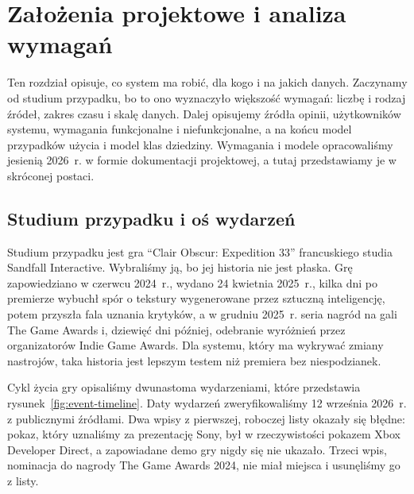 \chapter{Założenia projektowe i analiza wymagań}
\label{chap:requirements}


Ten rozdział opisuje, co system ma robić, dla kogo i na jakich danych.
Zaczynamy od studium przypadku, bo to ono wyznaczyło większość wymagań: liczbę i rodzaj źródeł, zakres czasu i skalę danych.
Dalej opisujemy źródła opinii, użytkowników systemu, wymagania funkcjonalne i niefunkcjonalne, a na końcu model przypadków użycia i model klas dziedziny.
Wymagania i modele opracowaliśmy jesienią 2026~r. w formie dokumentacji projektowej, a tutaj przedstawiamy je w skróconej postaci.

\section{Studium przypadku i oś wydarzeń}
\label{sec:req-case-study}

Studium przypadku jest gra \enquote{Clair Obscur: Expedition 33} francuskiego studia Sandfall Interactive.
Wybraliśmy ją, bo jej historia nie jest płaska.
Grę zapowiedziano w czerwcu 2024~r., wydano 24 kwietnia 2025~r., kilka dni po premierze wybuchł spór o tekstury wygenerowane przez sztuczną inteligencję, potem przyszła fala uznania krytyków, a w grudniu 2025~r. seria nagród na gali The Game Awards i, dziewięć dni później, odebranie wyróżnień przez organizatorów Indie Game Awards.
Dla systemu, który ma wykrywać zmiany nastrojów, taka historia jest lepszym testem niż premiera bez niespodzianek.

Cykl życia gry opisaliśmy dwunastoma wydarzeniami, które przedstawia rysunek~\ref{fig:event-timeline}.
Daty wydarzeń zweryfikowaliśmy 12 września 2026~r. z publicznymi źródłami.
Dwa wpisy z pierwszej, roboczej listy okazały się błędne: pokaz, który uznaliśmy za prezentację Sony, był w rzeczywistości pokazem Xbox Developer Direct, a zapowiadane demo gry nigdy się nie ukazało.
Trzeci wpis, nominacja do nagrody The Game Awards 2024, nie miał miejsca i usunęliśmy go z listy.

